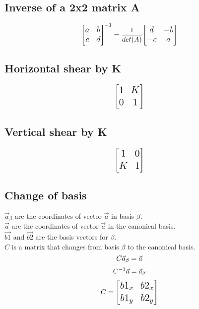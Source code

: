 \documentclass[11pt, a4paper, oneside]{book}
\begin{document}
\subsection{Inverse of a 2x2 matrix A}
\begin{equation*} 
\large{
\begin{bmatrix}
    a & b \\
    c & d
\end{bmatrix}^{-1} =
\LARGE{\frac{1}{det(A)}}
\large{
\begin{bmatrix}
    d & -b \\
    -c & a
\end{bmatrix}
}
}
\end{equation*}

\subsection{Horizontal shear by K}
\begin{equation*} 
\Large{
\begin{bmatrix}
    1 & K \\
    0 & 1
\end{bmatrix}
}
\end{equation*}


\subsection{Vertical shear by K}
\begin{equation*} 
\Large{
\begin{bmatrix}
    1 & 0 \\
    K & 1
\end{bmatrix}
}
\end{equation*}

\subsection{Change of basis}
\Large {$\vec{a}_\beta$ are the coordinates of vector $\vec{a}$ in basis $\beta$.\\}
\Large {$\vec{a}$ are the coordinates of vector $\vec{a}$ in the canonical basis.\\}
\Large {$\vec{b1}$ and $\vec{b2}$ are the basis vectors for $\beta$.\\}
\Large {$C$ is a matrix that changes from basis $\beta$ to the canonical basis.}
\begin{equation*}
\Large{C \vec{a}_\beta = \vec{a}}
\end{equation*} 
\begin{equation*}
\Large{C^{-1} \vec{a} = \vec{a}_\beta}
\end{equation*} 
\begin{equation*} 
\Large{
C = 
\begin{bmatrix}
    b1_x & b2_x \\
    b1_y & b2_y
\end{bmatrix}
}
\end{equation*}
\end{document}

